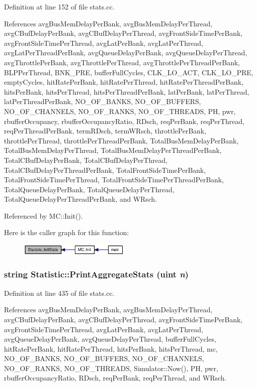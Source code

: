 Definition at line 152 of file stats.cc.

References avgBusMemDelayPerBank, avgBusMemDelayPerThread, avgCBufDelayPerBank, avgCBufDelayPerThread, avgFrontSideTimePerBank, avgFrontSideTimePerThread, avgLatPerBank, avgLatPerThread, avgLatPerThreadPerBank, avgQueueDelayPerBank, avgQueueDelayPerThread, avgThrottlePerBank, avgThrottlePerThread, avgThrottlePerThreadPerBank, BLPPerThread, BNK\_\-PRE, bufferFullCycles, CLK\_\-LO\_\-ACT, CLK\_\-LO\_\-PRE, emptyCycles, hitRatePerBank, hitRatePerThread, hitRatePerThreadPerBank, hitsPerBank, hitsPerThread, hitsPerThreadPerBank, latPerBank, latPerThread, latPerThreadPerBank, NO\_\-OF\_\-BANKS, NO\_\-OF\_\-BUFFERS, NO\_\-OF\_\-CHANNELS, NO\_\-OF\_\-RANKS, NO\_\-OF\_\-THREADS, PH, pwr, rbufferOccupancy, rbufferOccupancyRatio, RDsch, reqPerBank, reqPerThread, reqPerThreadPerBank, termRDsch, termWRsch, throttlePerBank, throttlePerThread, throttlePerThreadPerBank, TotalBusMemDelayPerBank, TotalBusMemDelayPerThread, TotalBusMemDelayPerThreadPerBank, TotalCBufDelayPerBank, TotalCBufDelayPerThread, TotalCBufDelayPerThreadPerBank, TotalFrontSideTimePerBank, TotalFrontSideTimePerThread, TotalFrontSideTimePerThreadPerBank, TotalQueueDelayPerBank, TotalQueueDelayPerThread, TotalQueueDelayPerThreadPerBank, and WRsch.

Referenced by MC::Init().

Here is the caller graph for this function:\nopagebreak
\begin{figure}[H]
\begin{center}
\leavevmode
\includegraphics[width=151pt]{classStatistic_fabb153ded71e9865b72ad0da907de0f_icgraph}
\end{center}
\end{figure}
\subsubsection[{PrintAggregateStats}]{\setlength{\rightskip}{0pt plus 5cm}string Statistic::PrintAggregateStats ({\bf uint} {\em n})}\label{classStatistic_fba2d32119e3a6da2f56aaee19944cf6}




Definition at line 435 of file stats.cc.

References avgBusMemDelayPerBank, avgBusMemDelayPerThread, avgCBufDelayPerBank, avgCBufDelayPerThread, avgFrontSideTimePerBank, avgFrontSideTimePerThread, avgLatPerBank, avgLatPerThread, avgQueueDelayPerBank, avgQueueDelayPerThread, bufferFullCycles, hitRatePerBank, hitRatePerThread, hitsPerBank, hitsPerThread, mc, NO\_\-OF\_\-BANKS, NO\_\-OF\_\-BUFFERS, NO\_\-OF\_\-CHANNELS, NO\_\-OF\_\-RANKS, NO\_\-OF\_\-THREADS, Simulator::Now(), PH, pwr, rbufferOccupancyRatio, RDsch, reqPerBank, reqPerThread, and WRsch.

